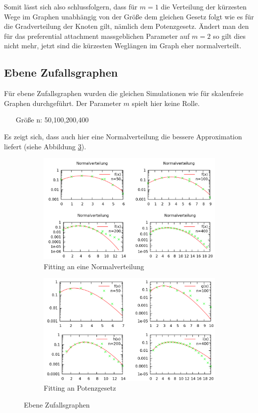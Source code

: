 \documentclass[10pt]{article}
\begin{document}
Somit lässt sich also schlussfolgern, dass für $m=1$ die Verteilung der kürzesten Wege im Graphen unabhängig von der Größe dem gleichen Gesetz folgt wie es für die Gradverteilung der Knoten gilt, nämlich dem Potenzgesetz. Ändert man den für das preferential attachment massgeblichen Parameter auf $m=2$ so gilt dies nicht mehr, jetzt sind die kürzesten Weglängen im Graph eher normalverteilt. 

\subsection{Ebene Zufallsgraphen}
Für ebene Zufallsgraphen wurden die gleichen Simulationen wie für skalenfreie Graphen durchgeführt. Der Parameter $m$ spielt hier keine Rolle.
\begin{itemize}
\item[Größe n:] 50,100,200,400
\end{itemize}
Es zeigt sich, dass auch hier eine Normalverteilung die bessere Approximation liefert (siehe Abbildung \ref{fig:planar}).

\begin{figure}[h!]
\begin{subfigure}{.5\textwidth}
  \centering
  \includegraphics[width=\linewidth]{../Results/Normal_Planar_logscale.png}
  \caption{Fitting an eine Normalverteilung}
  \label{fig:sfig1}
\end{subfigure}%
\begin{subfigure}{.5\textwidth}
  \centering
  \includegraphics[width=\linewidth]{../Results/Power_Planar_logscale.png}
  \caption{Fitting an Potenzgesetz}
  \label{fig:sfig2}
\end{subfigure}
\caption{Ebene Zufallsgraphen}
\label{fig:planar}
\end{figure}
\end{document}
